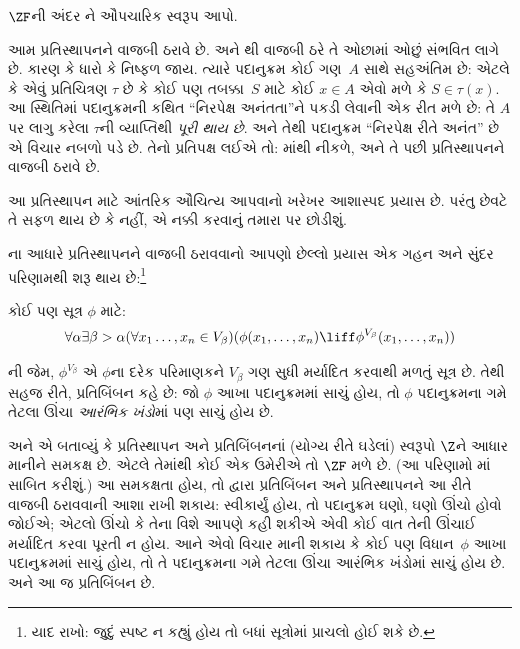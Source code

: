 \begin{prob}
	$\ZF$ની અંદર \stagescofin{}ને ઔપચારિક સ્વરૂપ આપો.
\end{prob}

આમ \stagescofin{} પ્રતિસ્થાપનને વાજબી ઠરાવે છે.
અને \stagesinex{}થી \stagescofin{} વાજબી ઠરે તે
ઓછામાં ઓછું સંભવિત લાગે છે. કારણ કે ધારો કે
\stagescofin{} નિષ્ફળ જાય. ત્યારે પદાનુક્રમ કોઈ ગણ~$A$
સાથે સહઅંતિમ છે: એટલે કે એવું પ્રતિચિત્રણ $\tau$ છે
કે કોઈ પણ તબક્કા~$S$ માટે કોઈ $x \in A$ એવો મળે
કે $S \in \tau(x)$. આ સ્થિતિમાં પદાનુક્રમની કથિત
``નિરપેક્ષ અનંતતા''ને પકડી લેવાની એક રીત મળે છે:
તે $A$ પર લાગુ કરેલા $\tau$ની વ્યાપ્તિથી
\emph{પૂરી થાય છે}. અને તેથી પદાનુક્રમ ``નિરપેક્ષ
રીતે અનંત'' છે એ વિચાર નબળો પડે છે. તેનો પ્રતિપક્ષ
લઈએ તો: \stagesinex{}માંથી \stagescofin{} નીકળે,
અને તે પછી પ્રતિસ્થાપનને વાજબી ઠરાવે છે.

આ પ્રતિસ્થાપન માટે આંતરિક ઔચિત્ય આપવાનો ખરેખર
આશાસ્પદ પ્રયાસ છે. પરંતુ છેવટે તે સફળ થાય છે કે
નહીં, એ નક્કી કરવાનું તમારા પર છોડીશું.
\endgroup

\begingroup
\makeatletter{}\makeatother

\label{guunit:OLP-0571}


\stagesinex{}ના આધારે પ્રતિસ્થાપનને વાજબી ઠરાવવાનો
આપણો છેલ્લો પ્રયાસ એક ગહન અને સુંદર પરિણામથી
શરૂ થાય છે:\footnote{યાદ રાખો: જુદું સ્પષ્ટ ન કહ્યું હોય
તો બધાં સૂત્રોમાં પ્રાચલો હોઈ શકે છે.}
\begin{thm}[પ્રતિબિંબનનું પ્રરૂપ]
કોઈ પણ સૂત્ર $\phi$ માટે:
\[
\forall \alpha \exists \beta > \alpha (\forall x_1 \ldots, x_n \in
V_\beta)(\phi(x_1, \ldots, x_n) \liff \phi^{V_\beta}(x_1, \ldots, x_n))
\]
\end{thm}
\noindent
{}ની જેમ,
$\phi^{V_\beta}$ એ $\phi$ના દરેક પરિમાણકને
$V_\beta$ ગણ સુધી મર્યાદિત કરવાથી મળતું સૂત્ર છે.
તેથી સહજ રીતે, પ્રતિબિંબન કહે છે: જો $\phi$ આખા
પદાનુક્રમમાં સાચું હોય, તો $\phi$ પદાનુક્રમના ગમે તેટલા
ઊંચા \emph{આરંભિક ખંડો}માં પણ સાચું હોય છે.

\citet{Montague1961} અને \citet{Levy1960}એ બતાવ્યું
કે પ્રતિસ્થાપન અને પ્રતિબિંબનનાં (યોગ્ય રીતે ઘડેલાં)
સ્વરૂપો $\Z$ને આધાર માનીને સમકક્ષ છે. એટલે તેમાંથી
કોઈ એક ઉમેરીએ તો $\ZF$ મળે છે. (આ પરિણામો
માં સાબિત કરીશું.)
આ સમકક્ષતા હોય, તો \stagesinex{} દ્વારા પ્રતિબિંબન અને
પ્રતિસ્થાપનને આ રીતે વાજબી ઠરાવવાની આશા રાખી શકાય:
\stagesinex{} સ્વીકાર્યું હોય, તો પદાનુક્રમ ઘણો, ઘણો
ઊંચો હોવો જોઈએ; એટલો ઊંચો કે તેના વિશે આપણે કહી
શકીએ એવી કોઈ વાત તેની ઊંચાઈ મર્યાદિત કરવા પૂરતી ન હોય.
આને એવો વિચાર માની શકાય કે કોઈ પણ વિધાન~$\phi$
આખા પદાનુક્રમમાં સાચું હોય, તો તે પદાનુક્રમના ગમે
તેટલા ઊંચા આરંભિક ખંડોમાં સાચું હોય છે. અને આ જ
પ્રતિબિંબન છે.

